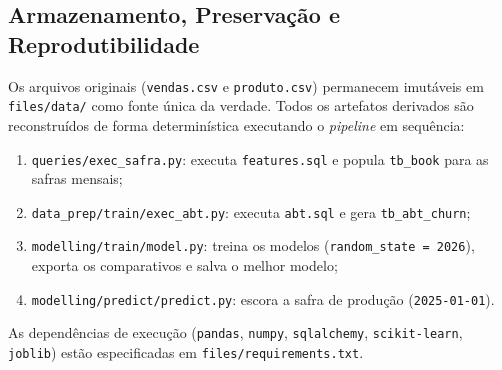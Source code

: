 \begin{sloppypar}
\subsection{Armazenamento, Preservação e Reprodutibilidade}\label{subsec:armazenamento_preservacao}

Os arquivos originais (\texttt{vendas.csv} e \texttt{produto.csv}) permanecem imutáveis em \texttt{files/data/} como fonte única da verdade. Todos os artefatos derivados são reconstruídos de forma determinística executando o \textit{pipeline} em sequência:
\begin{enumerate}[label=\arabic*.]
    \item \texttt{queries/exec\_safra.py}: executa \texttt{features.sql} e popula \texttt{tb\_book} para as safras mensais;
    \item \texttt{data\_prep/train/exec\_abt.py}: executa \texttt{abt.sql} e gera \texttt{tb\_abt\_churn};
    \item \texttt{modelling/train/model.py}: treina os modelos (\texttt{random\_state = 2026}), exporta os comparativos e salva o melhor modelo;
    \item \texttt{modelling/predict/predict.py}: escora a safra de produção (\texttt{2025-01-01}).
\end{enumerate}

As dependências de execução (\texttt{pandas}, \texttt{numpy}, \texttt{sqlalchemy}, \texttt{scikit-learn}, \texttt{joblib}) estão especificadas em \texttt{files/requirements.txt}.
\end{sloppypar}

